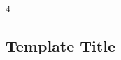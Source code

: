 \documentclass[landscape, 8pt]{extarticle}
\begin{document}
	
	\fontsize{5pt}{6pt} \selectfont
	
	\setlength\tabcolsep{4.5pt}
	\setlength\extrarowheight{2pt}
	
	\setlength{\abovedisplayskip}{0pt}
	\setlength{\belowdisplayskip}{0pt}
	\setlength{\abovedisplayshortskip}{0pt}
	\setlength{\belowdisplayshortskip}{0pt}
	
	\begin{multicols*}{4}
		\raggedcolumns 
		\vspace{-5pt}
		\subsection*{Template Title}
		\vspace{-5pt}
		
		
		
		
		
	\end{multicols*}
	
	
\end{document}
